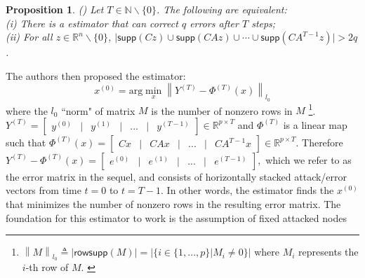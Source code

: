 \documentclass[twocolumn]{autart}    %
\newcommand{\norm}[1]{\left\lVert#1\right\rVert}
\newtheorem{Prop}{\bf{Proposition}}
\newcommand{\rev}[1]{{\normalsize{{{\color{blue}#1}}}}}
\begin{document}
\vspace{-0.2cm}
\begin{Prop}  \emph{(\hspace{1sp}\cite{Fawzi2014})}  \label{prop:Fawzi} 
Let $T \in \mathbb{N}  \backslash \{ 0\}$. The following are equivalent:\\
(i) There is a \rev{estimator} that can correct $q$ errors after $T$ steps;\\
(ii) For all $z\in \mathbb{R}^n \backslash \{0\}$, $\lvert \textsf{supp}(Cz) \cup \textsf{supp}(CAz) \cup \cdots \cup \textsf{supp}(CA^{T-1} z) \rvert > 2q$.
\end{Prop}
\noindent The authors then proposed the \rev{estimator}:
\begin{equation}
x^{(0)} = \text{arg} \min_{x} \norm { Y^{(T)} - \Phi ^{(T)} (x) }_{l_0} 
\label{eq:opt_decoder}
\end{equation}
where the $l_0$ ``norm" of matrix $M$ is the number of nonzero rows in $M$
\footnote{ \rev{$	\norm{M} _{l_0} \triangleq \lvert \textsf{rowsupp} (M) \rvert = \lvert \{ i \in \{ 1, ... , p\} | M_i \neq 0 \}  \rvert $
where $M_i$ represents the $i$-th row of $M$. }}. $Y^{(T)} = \begin{bmatrix} y^{(0)} & \lvert & y^{(1)} & \lvert  & ... & \lvert & y^{(T-1)} \end{bmatrix} \in \mathbb{R}^{p\times T}$ and $\Phi^{(T)}$ is a linear map such that $\Phi ^{(T)} (x) = \begin{bmatrix} Cx  & \lvert & CAx  & \lvert &  ... &  \lvert & CA^{T-1} x \end{bmatrix} \in \mathbb{R}^{p\times T}$. Therefore
$Y^{(T)} - \Phi ^{(T)} (x) =  \begin{bmatrix} e^{(0)}  & \lvert & e^{(1)} & \lvert &  ... &  \lvert & e^{(T-1)} \end{bmatrix},$
which we refer to as the error matrix in the sequel, and consists of horizontally stacked attack/error vectors from time $t=0$ to $t=T-1$.
In other words, the \rev{estimator} finds the $x^{(0)}$ that minimizes the number of nonzero rows in the resulting error matrix. The foundation for this \rev{estimator} to work is the assumption of fixed attacked nodes
\end{document}
